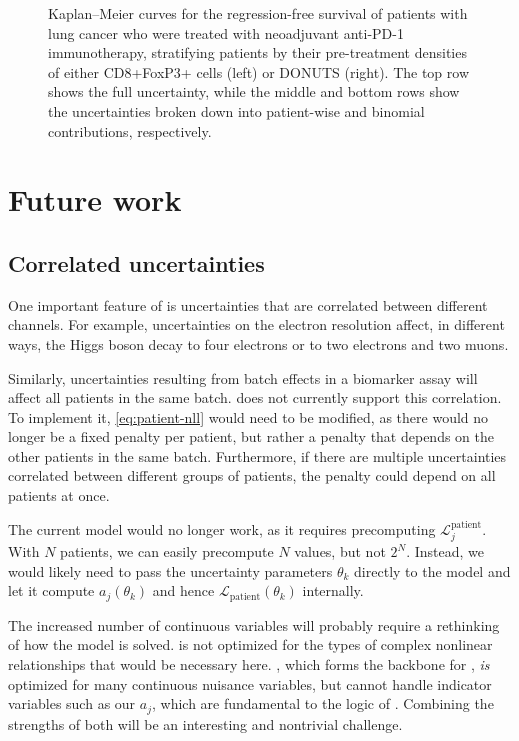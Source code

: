 \documentclass[article]{jss}
\newcommand{\KM}{Kaplan--Meier} %
\begin{document}
\begin{figure}[p]
\begin{subfigure}[t]{\figwidth}
    \caption{\label{fig:lung-dataset-donuts-binomial}}
  \end{subfigure}
  \caption{\label{fig:lung-dataset} \KM{} curves for the regression-free survival of patients with lung cancer who were treated with neoadjuvant anti-PD-1 immunotherapy, stratifying patients by their pre-treatment densities of either CD8+FoxP3+ cells (left) or DONUTS (right). The top row shows the full uncertainty, while the middle and bottom rows show the uncertainties broken down into patient-wise and binomial contributions, respectively.}
\end{figure}

\section{Future work}

\subsection{Correlated uncertainties}

One important feature of  is uncertainties that are correlated between different channels. For example, uncertainties on the electron resolution affect, in different ways, the Higgs boson decay to four electrons or to two electrons and two muons.

Similarly, uncertainties resulting from batch effects in a biomarker assay will affect all patients in the same batch\@.  does not currently support this correlation. To implement it, \cref{eq:patient-nll} would need to be modified, as there would no longer be a fixed penalty per patient, but rather a penalty that depends on the other patients in the same batch. Furthermore, if there are multiple uncertainties correlated between different groups of patients, the penalty could depend on all patients at once.

The current  model would no longer work, as it requires precomputing \(\mathcal{L}_j^{\text{patient}}\). With \(N\) patients, we can easily precompute \(N\) values, but not \(2^N\). Instead, we would likely need to pass the uncertainty parameters \(\theta_k\) directly to the  model and let it compute \(a_j\left(\theta_k\right)\) and hence \(\mathcal{L}_{\text{patient}}\left(\theta_k\right)\) internally.

The increased number of continuous variables will probably require a rethinking of how the model is solved\@.  is not optimized for the types of complex nonlinear relationships that would be necessary here\@. , which forms the backbone for , \emph{is} optimized for many continuous nuisance variables, but cannot handle indicator variables such as our \(a_j\), which are fundamental to the logic of . Combining the strengths of both will be an interesting and nontrivial challenge.
\end{document}
